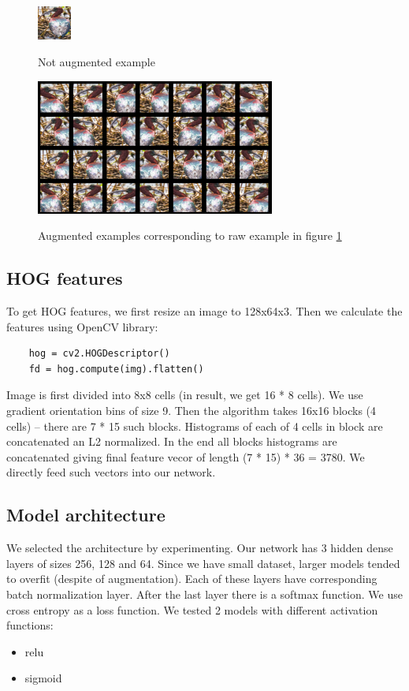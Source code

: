\documentclass[a4paper]{article}
\begin{document}
\begin{figure}[h]
    \caption[]{Not augmented example}
    \centering
    \includegraphics[page=2,width=0.1\textwidth]{aug1.png}
    \label{fig:aug1}
\end{figure}

\begin{figure}[h]
    \caption[]{Augmented examples corresponding to raw example in figure \ref{fig:aug1}}
    \centering
    \includegraphics[page=2,width=0.7\textwidth]{aug2.png}
    \label{fig:aug2}
\end{figure}


\subsection{HOG features}
To get HOG features, we first resize an image to 128x64x3.
Then we calculate the features using OpenCV library:
\begin{verbatim}
    hog = cv2.HOGDescriptor()
    fd = hog.compute(img).flatten()
\end{verbatim}
Image is first divided into 8x8 cells (in result, we get 16 * 8 cells).
We use gradient orientation bins of size 9.
Then the algorithm takes 16x16 blocks (4 cells) --
there are 7 * 15 such blocks.
Histograms of each of 4 cells in block are concatenated an L2 normalized.
In the end all blocks histograms are concatenated giving
final feature vecor of length (7 * 15) * 36 = 3780.
We directly feed such vectors into our network.

\subsection{Model architecture}
We selected the architecture by experimenting.
Our network has 3 hidden dense layers of sizes 256, 128 and 64.
Since we have small dataset, larger models tended to overfit
(despite of augmentation).
Each of these layers have corresponding batch normalization layer.
After the last layer there is a softmax function.
We use cross entropy as a loss function.
We tested 2 models with different activation functions:
\begin{itemize}
    \item relu
    \item sigmoid
\end{itemize}
\end{document}
